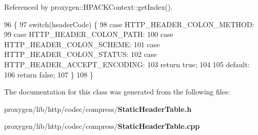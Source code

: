 Referenced by proxygen\+::\+H\+P\+A\+C\+K\+Context\+::get\+Index().


\begin{DoxyCode}
96                                \{
97   \textcolor{keywordflow}{switch}(headerCode) \{
98     \textcolor{keywordflow}{case} HTTP\_HEADER\_COLON\_METHOD:
99     \textcolor{keywordflow}{case} HTTP\_HEADER\_COLON\_PATH:
100     \textcolor{keywordflow}{case} HTTP\_HEADER\_COLON\_SCHEME:
101     \textcolor{keywordflow}{case} HTTP\_HEADER\_COLON\_STATUS:
102     \textcolor{keywordflow}{case} HTTP\_HEADER\_ACCEPT\_ENCODING:
103       \textcolor{keywordflow}{return} \textcolor{keyword}{true};
104 
105     \textcolor{keywordflow}{default}:
106       \textcolor{keywordflow}{return} \textcolor{keyword}{false};
107   \}
108 \}
\end{DoxyCode}


The documentation for this class was generated from the following files\+:\begin{DoxyCompactItemize}
\item 
proxygen/lib/http/codec/compress/{\bf Static\+Header\+Table.\+h}\item 
proxygen/lib/http/codec/compress/{\bf Static\+Header\+Table.\+cpp}\end{DoxyCompactItemize}
